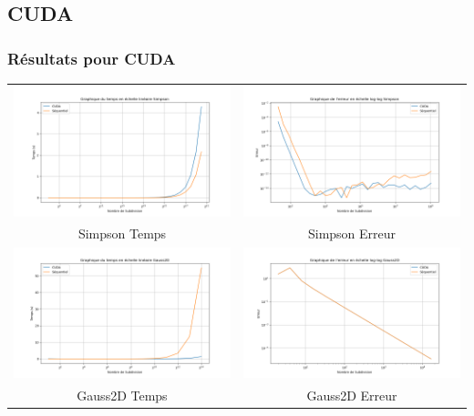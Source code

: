 \documentclass[10pt]{beamer}
\begin{document}
\subsection{CUDA}

\begin{frame}
    \frametitle{Résultats pour CUDA}
        \small
    \begin{tabular}{cc}
        \includegraphics[width=0.45\linewidth]{Images/time_simpson_cuda.png} &
        \includegraphics[width=0.45\linewidth]{Images/error_simpson_cuda.png} \\
        Simpson Temps & Simpson Erreur\\
        \includegraphics[width=0.45\linewidth]{Images/time_Gauss2D_cuda.png} &
        \includegraphics[width=0.45\linewidth]{Images/error_Gauss2D_cuda.png} \\
        Gauss2D Temps & Gauss2D Erreur\\
    \end{tabular}
        
\end{frame}
\end{document}
